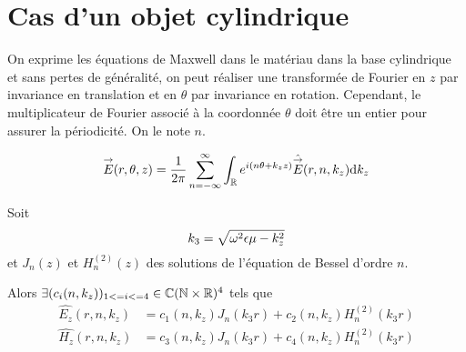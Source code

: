 \section{Cas d'un objet cylindrique}


  \begin{figure}[!hbt]
    \centering
    \begin{tikzpicture}
      
    \end{tikzpicture}
  \end{figure}

  On exprime les équations de Maxwell dans le matériau dans la base cylindrique et sans pertes de généralité, on peut réaliser une transformée de Fourier en \(z\) par invariance en translation et en \(\theta\) par invariance en rotation.
  Cependant, le multiplicateur de Fourier associé à la coordonnée \(\theta\) doit être un entier pour assurer la périodicité. On le note \(n\).

  \begin{equation}
    \vE(r,\theta,z) = \frac{1}{2\pi}\sum_{n=-\infty}^{\infty}\int_{\RR} e^{i(n \theta + k_z z )}\hat{\vE} (r,n,k_z) \dd{k_z}
  \end{equation}

  \begin{prop}
    Soit
    \begin{equation}
      k_3 = \sqrt{\w^2\eps\mu - k_z^2}
    \end{equation}
    et \(J_n(z)\) et \(H_n^{(2)}(z)\) des solutions de l'équation de Bessel d'ordre \(n\).

    Alors \(\exists (c_i(n,k_z))_{1<=i<=4} \in \CC(\NN\times\RR)^4\) tels que
    \begin{subequations}
      \begin{align}
        \hat{E_z}(r,n,k_z) &= c_1(n,k_z) J_n\left(k_3r\right) + c_2(n,k_z) H_n^{(2)}\left(k_3r\right)
        \\
        \hat{H_z}(r,n,k_z) &= c_3(n,k_z) J_n\left(k_3r\right) + c_4(n,k_z) H_n^{(2)}\left(k_3r\right)
      \end{align}
    \end{subequations}
  \end{prop}

